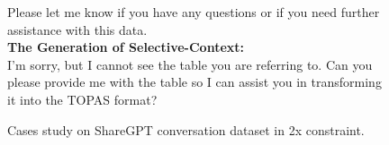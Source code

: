 \begin{figure*}[htb]
\begin{tcolorbox}
    Please let me know if you have any questions or if you need further assistance with this data.\\
    \textbf{The Generation of Selective-Context:}\\
    I'm sorry, but I cannot see the table you are referring to. Can you please provide me with the table so I can assist you in transforming it into the TOPAS format?
    \end{tcolorbox}
    \caption{Cases study on ShareGPT conversation dataset in 2x constraint.}
    \label{fig:case_sharegpt}
\end{figure*}


